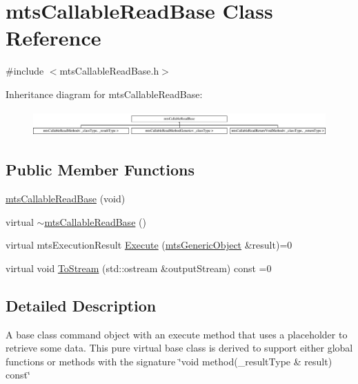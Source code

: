 \hypertarget{classmts_callable_read_base}{}\section{mts\+Callable\+Read\+Base Class Reference}
\label{classmts_callable_read_base}


{\ttfamily \#include $<$mts\+Callable\+Read\+Base.\+h$>$}

Inheritance diagram for mts\+Callable\+Read\+Base\+:\begin{figure}[H]
\begin{center}
\leavevmode
\includegraphics[height=0.972222cm]{d3/d9b/classmts_callable_read_base}
\end{center}
\end{figure}
\subsection*{Public Member Functions}
\begin{DoxyCompactItemize}
\item 
\hyperlink{classmts_callable_read_base_a2e41f1bfecb9bda1ca5e0d0ee10f3a0e}{mts\+Callable\+Read\+Base} (void)
\item 
virtual \hyperlink{classmts_callable_read_base_a46a1b8f36181396ab482e3e0fa7f8e72}{$\sim$mts\+Callable\+Read\+Base} ()
\item 
virtual mts\+Execution\+Result \hyperlink{classmts_callable_read_base_ab5dbf9b7df75841d7f0a48fa40358d5f}{Execute} (\hyperlink{classmts_generic_object}{mts\+Generic\+Object} \&result)=0
\item 
virtual void \hyperlink{classmts_callable_read_base_a934fc1fadbf9bedcbfd5f498a07a4160}{To\+Stream} (std\+::ostream \&output\+Stream) const =0
\end{DoxyCompactItemize}


\subsection{Detailed Description}
A base class command object with an execute method that uses a placeholder to retrieve some data. This pure virtual base class is derived to support either global functions or methods with the signature \char`\"{}void method(\+\_\+result\+Type \& result) const\char`\"{} 

